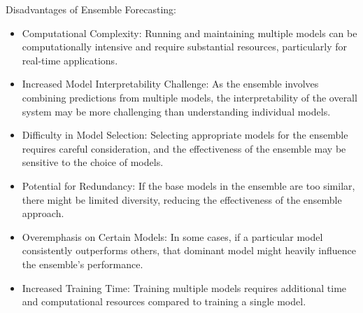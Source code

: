 \documentclass[../paper.tex]{subfiles}
\begin{document}
Disadvantages of Ensemble Forecasting:
\begin{itemize}
    \item Computational Complexity:
    Running and maintaining multiple models can be computationally intensive and require substantial resources,
    particularly for real-time applications.

    \item Increased Model Interpretability Challenge:
    As the ensemble involves combining predictions from multiple models,
    the interpretability of the overall system may be more challenging than understanding individual models.

    \item Difficulty in Model Selection: Selecting appropriate models for the ensemble requires careful consideration,
    and the effectiveness of the ensemble may be sensitive to the choice of models.

    \item Potential for Redundancy: If the base models in the ensemble are too similar,
    there might be limited diversity, reducing the effectiveness of the ensemble approach.

    \item Overemphasis on Certain Models:
    In some cases, if a particular model consistently outperforms others,
    that dominant model might heavily influence the ensemble's performance.

    \item Increased Training Time:
    Training multiple models requires additional time and computational resources compared to training a single model.
\end{itemize}
\end{document}
